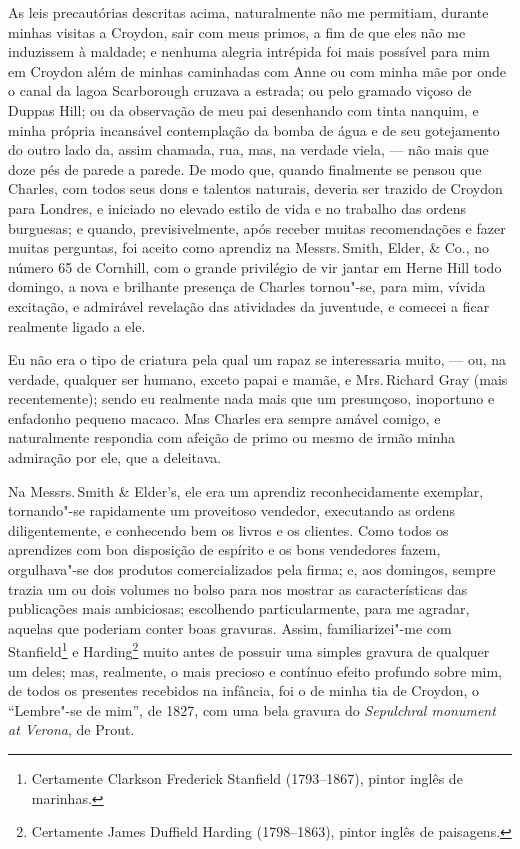 As leis precautórias descritas acima, naturalmente não me
permitiam, durante minhas visitas a Croydon, sair com meus primos, a fim
de que eles não me induzissem à maldade; e nenhuma alegria intrépida foi
mais possível para mim em Croydon além de minhas caminhadas com Anne ou
com minha mãe por onde o canal da lagoa Scarborough cruzava a estrada;
ou pelo gramado viçoso de Duppas Hill; ou da observação de meu pai
desenhando com tinta nanquim, e minha própria incansável contemplação da
bomba de água e de seu gotejamento do outro lado da, assim chamada, rua,
mas, na verdade viela, --- não mais que doze pés de parede a parede. De
modo que, quando finalmente se pensou que Charles, com todos seus dons e
talentos naturais, deveria ser trazido de Croydon para Londres, e
iniciado no elevado estilo de vida e no trabalho das ordens burguesas; e
quando, previsivelmente, após receber muitas recomendações e fazer
muitas perguntas, foi aceito como aprendiz na Messrs.\,Smith, Elder, \&
Co., no número 65 de Cornhill, com o grande privilégio de vir jantar em
Herne Hill todo domingo, a nova e brilhante presença de Charles
tornou"-se, para mim, vívida excitação, e admirável revelação das
atividades da juventude, e comecei a ficar realmente ligado a ele.

Eu não era o tipo de criatura pela qual um rapaz se interessaria muito,
--- ou, na verdade, qualquer ser humano, exceto papai e mamãe, e Mrs.\,Richard Gray (mais recentemente); sendo eu realmente nada mais que um
presunçoso, inoportuno e enfadonho pequeno macaco. Mas Charles era
sempre amável comigo, e naturalmente respondia com afeição de primo ou
mesmo de irmão minha admiração por ele, que a deleitava.

Na Messrs.\,Smith \& Elder's, ele era um aprendiz reconhecidamente \label{102}
exemplar, tornando"-se rapidamente um proveitoso vendedor, executando as
ordens diligentemente, e conhecendo bem os livros e os clientes. Como
todos os aprendizes com boa disposição de espírito e os bons vendedores
fazem, orgulhava"-se dos produtos comercializados pela firma; e, aos
domingos, sempre trazia um ou dois volumes no bolso para nos mostrar as
características das publicações mais ambiciosas; escolhendo
particularmente, para me agradar, aquelas que poderiam conter boas
gravuras. Assim, familiarizei"-me com Stanfield\footnote{Certamente
  Clarkson Frederick Stanfield (1793--1867), pintor inglês de marinhas.} e Harding\footnote{Certamente James Duffield Harding
  (1798--1863), pintor inglês de paisagens.} muito antes
de possuir uma simples gravura de qualquer um deles; mas, realmente, o
mais precioso e contínuo efeito profundo sobre mim, de todos os
presentes recebidos na infância, foi o de minha tia de Croydon, o
``Lembre"-se de mim'', de 1827, com uma bela gravura do \textit{Sepulchral
monument at Verona}, de Prout.

